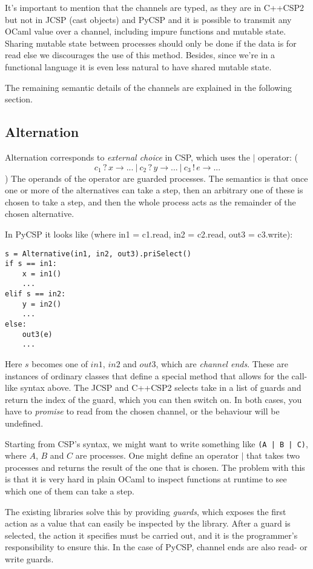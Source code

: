 \documentclass[a4paper,12pt]{article}
\begin{document}
It's important to mention that the channels are typed, as they are in C++CSP2
but not in JCSP (cast objects) and PyCSP and it is possible to transmit any
OCaml value over a channel, including impure functions and mutable state.
Sharing mutable state between processes should only be done if the data is for
read else we discourages the use of this method. Besides, since we're in a
functional language it is even less natural to have shared mutable state.

The remaining semantic details of the channels are explained in the following
section.

\subsection{Alternation}
Alternation corresponds to \emph{external choice} in CSP, which uses the $|$ operator:
(\[c_1\,?\,x \to ...\ |\ c_2\,?\,y \to ...\ |\ c_3\,!\,e \to ...\])
The operands of the operator are guarded processes. The semantics is that once one or 
more of the alternatives can take a step, then an arbitrary one of these is chosen to take a 
step, and then the whole process acts as the remainder of the chosen alternative.

In PyCSP it looks like (where in1 = c1.read, in2 = c2.read, out3 = c3.write):
\begin{verbatim}
s = Alternative(in1, in2, out3).priSelect()
if s == in1:
    x = in1()
    ...
elif s == in2:
    y = in2()
    ...
else:
    out3(e)
    ...
\end{verbatim}
Here $s$ becomes one of $in1$, $in2$ and $out3$, which are \emph{channel ends}. These are instances
of ordinary classes that define a special method that allows for the call-like syntax above.
The JCSP and C++CSP2 selects take in a list of guards and return the index of the guard, which you can 
then switch on. In both cases, you have to \emph{promise} to read from the chosen channel, or the 
behaviour will be undefined.

Starting from CSP's syntax, we might want to write something like \texttt{(A | B | C)}, where $A$, $B$
and $C$ are processes. One might define an operator $|$ that takes two processes and returns the result 
of the one that is chosen. The problem with this is that it is very hard in plain OCaml to inspect 
functions at runtime to see which one of them can take a step.

The existing libraries solve this by providing \emph{guards}, which exposes the first action as a value 
that can easily be inspected by the library. After a guard is selected, the action it specifies must be 
carried out, and it is the programmer's responsibility to ensure this. In the case of PyCSP, channel
ends are also read- or write guards. 
\end{document}
